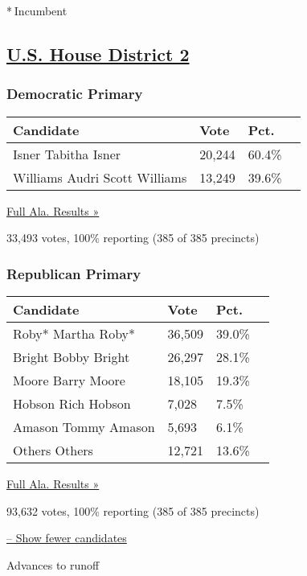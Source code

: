 * Incumbent

\hypertarget{us-house-district-2}{%
\subsection{\texorpdfstring{\href{https://www.nytimes3xbfgragh.onion/elections/results/alabama-house-district-2-primary-election}{U.S.
House District 2}}{U.S. House District 2}}\label{us-house-district-2}}

\hypertarget{democratic-primary-2}{%
\subsubsection{Democratic Primary}\label{democratic-primary-2}}

\begin{longtable}[]{@{}llll@{}}
\toprule
Candidate & Vote & Pct. &\tabularnewline
\midrule
\endhead
 Isner Tabitha Isner & 20,244 & 60.4\% &\tabularnewline
 Williams Audri Scott Williams & 13,249 & 39.6\% &\tabularnewline
\bottomrule
\end{longtable}

\href{https://www.nytimes3xbfgragh.onion/elections/results/alabama}{Full
Ala. Results »}

33,493 votes, 100\% reporting (385 of 385 precincts)

\hypertarget{republican-primary-2}{%
\subsubsection{Republican Primary}\label{republican-primary-2}}

\begin{longtable}[]{@{}llll@{}}
\toprule
Candidate & Vote & Pct. &\tabularnewline
\midrule
\endhead
 Roby* Martha Roby* & 36,509 & 39.0\% &\tabularnewline
 Bright Bobby Bright & 26,297 & 28.1\% &\tabularnewline
 Moore Barry Moore & 18,105 & 19.3\% &\tabularnewline
 Hobson Rich Hobson & 7,028 & 7.5\% &\tabularnewline
 Amason Tommy Amason & 5,693 & 6.1\% &\tabularnewline
 Others Others & 12,721 & 13.6\% &\tabularnewline
\bottomrule
\end{longtable}

\href{https://www.nytimes3xbfgragh.onion/elections/results/alabama}{Full
Ala. Results »}

93,632 votes, 100\% reporting (385 of 385 precincts)

\protect\hyperlink{}{-- Show fewer candidates}

 Advances to runoff

